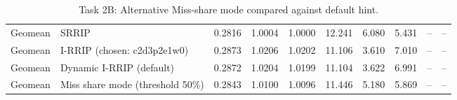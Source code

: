 \begin{table}[H]
{\begin{tabular}{llrrrrrrrr}
Geomean & SRRIP & 0.2816 & 1.0004 & 1.0000 & 12.241 & 6.080 & 5.431 & -- & -- \\
Geomean & I-RRIP (chosen: c2d3p2e1w0) & 0.2873 & 1.0206 & 1.0202 & 11.106 & 3.610 & 7.010 & -- & -- \\
Geomean & Dynamic I-RRIP (default) & 0.2872 & 1.0204 & 1.0199 & 11.104 & 3.622 & 6.991 & -- & -- \\
Geomean & Miss share mode (threshold 50\%) & 0.2843 & 1.0100 & 1.0096 & 11.446 & 5.180 & 5.869 & -- & -- \\
\bottomrule
\end{tabular}}
\ifdim\wd\fitbx>\linewidth\resizebox{\linewidth}{!}{\usebox{\fitbx}}\else\usebox{\fitbx}\fi
\caption{Task 2B: Alternative Miss-share mode compared against default hint.}\label{tab:t2b_share}
\end{table}
